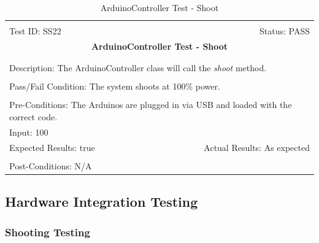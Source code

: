 \documentclass[11pt]{article}
\begin{document}
\begin{center}
\begin{table}[H]
\begin{tabular}{|l r|}\hline&\\[-2mm]
	Test ID: SS22	&Status: PASS\\[-3mm]
	\multicolumn{2}{|c|}{\textbf{\large{ArduinoController Test - Shoot}}}\\&\\\hline&\\[-3mm]
	\multicolumn{2}{|p{\textwidth}|}{Description: The ArduinoController class will call the \textit{shoot} method.}\\[1mm]\hline&\\[-3mm]
	\multicolumn{2}{|p{\textwidth}|}{Pass/Fail Condition: The system shoots at 100\% power.}\\[1mm]\hline&\\[-3mm]
	\multicolumn{2}{|p{\textwidth}|}{Pre-Conditions: The Arduinos are plugged in via USB and loaded with the correct code.}\\[4mm]
	\multicolumn{2}{|p{\textwidth}|}{Input: 100}\\[2mm]\hline
	\multicolumn{1}{|p{0.49\textwidth}}{Expected Results: true}	&\multicolumn{1}{|p{0.45\textwidth}|}{Actual Results: As expected}\\\hline&\\[-3mm]
	\multicolumn{2}{|p{\textwidth}|}{Post-Conditions: N/A}\\\hline
\end{tabular}
\caption{ArduinoController Test - Shoot}
\end{table}
\end{center}

\subsection{Hardware Integration Testing}
\subsubsection{Shooting Testing}
\end{document}
